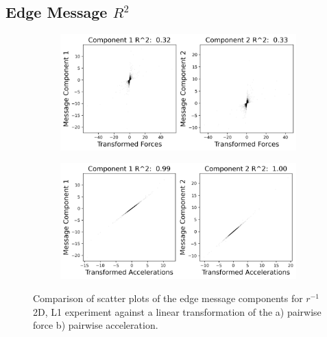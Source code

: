\documentclass[11pt]{article}
\begin{document}
\subsection{Edge Message $R^2$}
\begin{figure}[H]
    \centering
    \begin{subfigure}{0.45\textwidth}
        \includegraphics[width=\textwidth]{figs/r1_2d_force_r2.png}
        \caption{}
    \end{subfigure}
    \begin{subfigure}{0.45\textwidth}
        \includegraphics[width=\textwidth]{figs/r1_2d_accel_r2.png}
        \caption{}
    \end{subfigure}
    \caption{Comparison of scatter plots of the edge message components for $r^{-1}$ 2D, L1 experiment against a linear transformation of the a)  pairwise force b) pairwise acceleration.}
    \label{fig:scatter_plots}
\end{figure}
\end{document}
